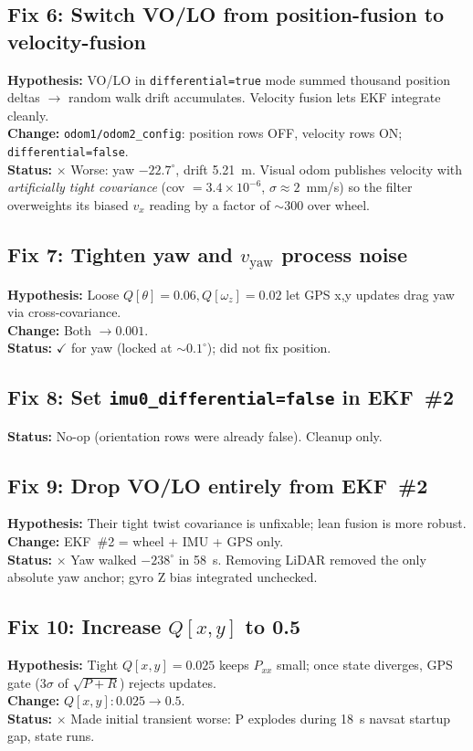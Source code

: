 \documentclass[11pt,a4paper]{article}
\newcommand{\good}[1]{\textcolor{good}{\textbf{#1}}}
\newcommand{\bad}[1]{\textcolor{bad}{\textbf{#1}}}
\begin{document}
\subsection{Fix 6: Switch VO/LO from position-fusion to velocity-fusion}
\textbf{Hypothesis:} VO/LO in \texttt{differential=true} mode summed thousand position deltas
$\to$ random walk drift accumulates. Velocity fusion lets EKF integrate cleanly.\\
\textbf{Change:} \texttt{odom1/odom2\_config}: position rows OFF, velocity rows ON; \texttt{differential=false}.\\
\textbf{Status:} \bad{$\times$} Worse: yaw $-22.7^\circ$, drift 5.21~m. Visual odom publishes velocity with
\emph{artificially tight covariance} (cov $= 3.4\!\times\!10^{-6}$, $\sigma\!\approx\!2$~mm/s) so the filter
overweights its biased $v_x$ reading by a factor of $\sim\!300$ over wheel.

\subsection{Fix 7: Tighten yaw and $v_{\mathrm{yaw}}$ process noise}
\textbf{Hypothesis:} Loose $Q[\theta]\!=\!0.06, Q[\omega_z]\!=\!0.02$ let GPS x,y updates drag yaw via cross-covariance.\\
\textbf{Change:} Both $\to 0.001$.\\
\textbf{Status:} \good{$\checkmark$} for yaw (locked at $\sim\!\!0.1^\circ$); did not fix position.

\subsection{Fix 8: Set \texttt{imu0\_differential=false} in EKF~\#2}
\textbf{Status:} No-op (orientation rows were already false). Cleanup only.

\subsection{Fix 9: Drop VO/LO entirely from EKF~\#2}
\textbf{Hypothesis:} Their tight twist covariance is unfixable; lean fusion is more robust.\\
\textbf{Change:} EKF~\#2 = wheel + IMU + GPS only.\\
\textbf{Status:} \bad{$\times$} Yaw walked $-238^\circ$ in 58~s. Removing LiDAR removed the only absolute
yaw anchor; gyro Z bias integrated unchecked.

\subsection{Fix 10: Increase $Q[x,y]$ to 0.5}
\textbf{Hypothesis:} Tight $Q[x,y]=0.025$ keeps $P_{xx}$ small; once state diverges, GPS gate (3$\sigma$
of $\sqrt{P+R}$) rejects updates.\\
\textbf{Change:} $Q[x,y]: 0.025 \to 0.5$.\\
\textbf{Status:} \bad{$\times$} Made initial transient worse: P explodes during 18~s navsat startup gap, state runs.
\end{document}
